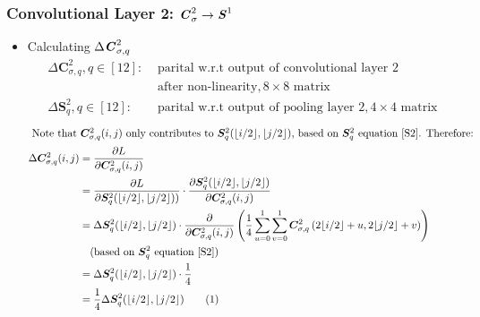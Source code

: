 \documentclass[12pt]{article}
\newcommand\numberthis{\stepcounter{equation}\tag{\theequation}}
\begin{document}
\subsubsection{Convolutional Layer 2: $\textbf{\textit{C}}^2_\sigma \rightarrow \textbf{\textit{S}}^1$}
\begin{itemize}
\item Calculating $\Delta \textbf{\textit{C}}_{\sigma, q}^2$
\begin{align*}
    \Delta \bm{C}_{\sigma, q}^2, q \in [12]:& \text{ parital w.r.t output of convolutional layer 2} \\& \text{ after non-linearity}, 8 \times 8 \text{ matrix}\\
    \Delta \bm{S}^2_q, q \in [12]:& \text{ parital w.r.t output of pooling layer 2}, 4 \times 4 \text{ matrix}
\end{align*}
\begin{align*}
    \intertext{
    Note that $\bm{C}_{\sigma, q}^2(i, j)$ only contributes to $\bm{S}_{q}^2(\lfloor{i / 2}\rfloor, \lfloor{j / 2}\rfloor)$, based on $\bm{S}_{q}^2$ equation $\eqref{S2}$. Therefore:
    }
    \Delta \bm{C}_{\sigma, q}^2(i, j)
    &= \frac{\partial L}{\partial \bm{C}_{\sigma, q}^2(i, j)}
    \\
    &= \frac{\partial L}{\partial \bm{S}_{q}^2(\lfloor{i / 2}\rfloor, \lfloor{j / 2}\rfloor))}
    \cdot
    \frac{\partial \bm{S}_{q}^2(\lfloor{i / 2}\rfloor, \lfloor{j / 2}\rfloor)}{\partial \bm{C}_{\sigma, q}^2(i, j)}
    \\
    &= \Delta \bm{S}_{q}^2(\lfloor{i / 2}\rfloor, \lfloor{j / 2}\rfloor) \cdot \frac{\partial}{\partial \bm{C}_{\sigma, q}^2(i, j)}\left(\frac{1}{4}\sum_{u = 0}^1\sum_{v = 0}^1\bm{C}^2_{\sigma, q}\left(2\lfloor{i / 2}\rfloor + u, 2\lfloor{j / 2}\rfloor + v\right)\right)
    \\
    &\quad (\text{based on $\bm{S}_{q}^2$ equation } \eqref{S2})
    \\
    &= \Delta \bm{S}_{q}^2(\lfloor{i / 2}\rfloor, \lfloor{j / 2}\rfloor) \cdot \frac{1}{4}
    \\
    &= \frac{1}{4}\Delta \bm{S}_{q}^2(\lfloor{i / 2}\rfloor, \lfloor{j / 2}\rfloor)
    \numberthis \label{delta_C2_sigma}
\end{align*}


\end{itemize}
\end{document}
